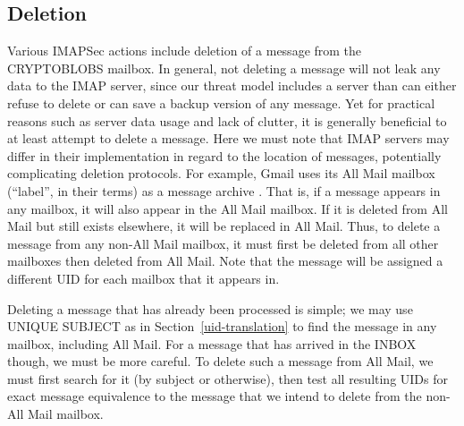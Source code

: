 \documentclass[pageno]{jpaper}
\newcommand{\project}{IMAPSec }
\begin{document}
\subsection{Deletion}
Various \project actions include deletion of a message from the CRYPTOBLOBS mailbox. In general, not deleting a message will not leak any data to the IMAP server, since our threat model includes a server than can either refuse to delete or can save a backup version of any message. Yet for practical reasons such as server data usage and lack of clutter, it is generally beneficial to at least attempt to delete a message. Here we must note that IMAP servers may differ in their implementation in regard to the location of messages, potentially complicating deletion protocols. For example, Gmail uses its All Mail mailbox (``label'', in their terms) as a message archive \cite{allmail}. That is, if a message appears in any mailbox, it will also appear in the All Mail mailbox. If it is deleted from All Mail but still exists elsewhere, it will be replaced in All Mail. Thus, to delete a message from any non-All Mail mailbox, it must first be deleted from all other mailboxes then deleted from All Mail. Note that the message will be assigned a different UID for each mailbox that it appears in.

Deleting a message that has already been processed is simple; we may use UNIQUE SUBJECT as in Section~\ref{uid-translation} to find the message in any mailbox, including All Mail. For a message that has arrived in the INBOX though, we must be more careful. To delete such a message from All Mail, we must first search for it (by subject or otherwise), then test all resulting UIDs for exact message equivalence to the message that we intend to delete from the non-All Mail mailbox.
\end{document}
